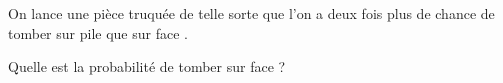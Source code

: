 
On lance une pièce truquée de telle sorte que l'on a deux fois plus de chance de tomber sur \og pile \fg{} que sur \og face \fg.

Quelle est la probabilité de tomber sur \og face \fg ?

\smallskip
{}
